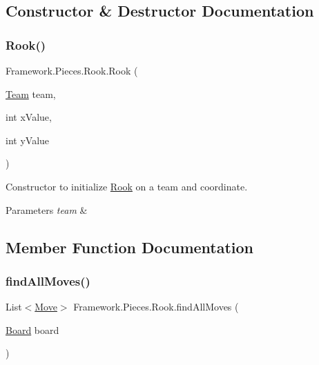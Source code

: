 \subsection{Constructor \& Destructor Documentation}
\hypertarget{class_framework_1_1_pieces_1_1_rook_a537a1bad0e427c7891e87bb0393867cb}{}\label{class_framework_1_1_pieces_1_1_rook_a537a1bad0e427c7891e87bb0393867cb} 
\subsubsection{\texorpdfstring{Rook()}{Rook()}}
{\footnotesize\ttfamily Framework.\+Pieces.\+Rook.\+Rook (\begin{DoxyParamCaption}\item[{\hyperlink{class_framework_1_1_team}{Team}}]{team,  }\item[{int}]{x\+Value,  }\item[{int}]{y\+Value }\end{DoxyParamCaption})}

Constructor to initialize \hyperlink{class_framework_1_1_pieces_1_1_rook}{Rook} on a team and coordinate. 
\begin{DoxyParams}{Parameters}
{\em team} & \\
\hline
\end{DoxyParams}


\subsection{Member Function Documentation}
\hypertarget{class_framework_1_1_pieces_1_1_rook_a1733e5f2d272bfe4a7db8f0cb2606c5d}{}\label{class_framework_1_1_pieces_1_1_rook_a1733e5f2d272bfe4a7db8f0cb2606c5d} 
\subsubsection{\texorpdfstring{find\+All\+Moves()}{findAllMoves()}}
{\footnotesize\ttfamily List$<$\hyperlink{class_framework_1_1_move}{Move}$>$ Framework.\+Pieces.\+Rook.\+find\+All\+Moves (\begin{DoxyParamCaption}\item[{\hyperlink{class_framework_1_1_board}{Board}}]{board }\end{DoxyParamCaption})}

